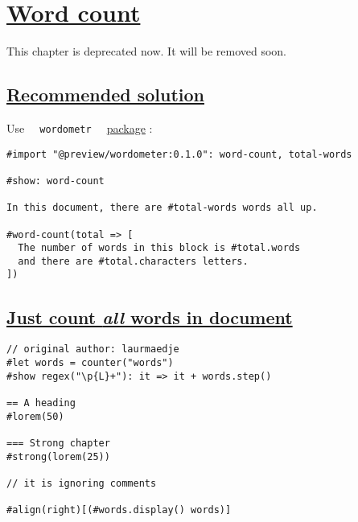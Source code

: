 \section{\texorpdfstring{\hyperref[word-count]{Word
count}}{Word count}}\label{word-count}

This chapter is deprecated now. It will be removed soon.

\subsection{\texorpdfstring{\hyperref[recommended-solution]{Recommended
solution}}{Recommended solution}}\label{recommended-solution}

Use \texttt{\ }{\texttt{\ wordometr\ }}\texttt{\ }
\href{https://github.com/Jollywatt/typst-wordometer}{package} :

\begin{verbatim}
#import "@preview/wordometer:0.1.0": word-count, total-words

#show: word-count

In this document, there are #total-words words all up.

#word-count(total => [
  The number of words in this block is #total.words
  and there are #total.characters letters.
])
\end{verbatim}

\pandocbounded{}

\subsection{\texorpdfstring{\hyperref[just-count-all-words-in-document]{Just
count \emph{all} words in
document}}{Just count all words in document}}\label{just-count-all-words-in-document}

\begin{verbatim}
// original author: laurmaedje
#let words = counter("words")
#show regex("\p{L}+"): it => it + words.step()

== A heading
#lorem(50)

=== Strong chapter
#strong(lorem(25))

// it is ignoring comments

#align(right)[(#words.display() words)]
\end{verbatim}

\pandocbounded{}

